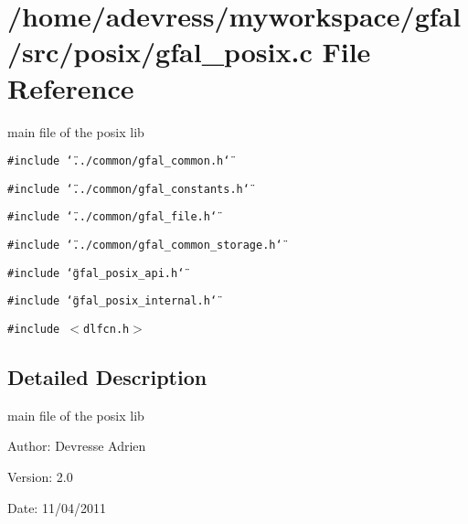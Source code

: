 \section{/home/adevress/myworkspace/gfal/src/posix/gfal\_\-posix.c File Reference}
\label{gfal__posix_8c}
main file of the posix lib 

{\tt \#include \char`\"{}../common/gfal\_\-common.h\char`\"{}}\par
{\tt \#include \char`\"{}../common/gfal\_\-constants.h\char`\"{}}\par
{\tt \#include \char`\"{}../common/gfal\_\-file.h\char`\"{}}\par
{\tt \#include \char`\"{}../common/gfal\_\-common\_\-storage.h\char`\"{}}\par
{\tt \#include \char`\"{}gfal\_\-posix\_\-api.h\char`\"{}}\par
{\tt \#include \char`\"{}gfal\_\-posix\_\-internal.h\char`\"{}}\par
{\tt \#include $<$dlfcn.h$>$}\par


\subsection{Detailed Description}
main file of the posix lib 

\begin{Desc}
\item[Author:]Devresse Adrien \end{Desc}
\begin{Desc}
\item[Version:]2.0 \end{Desc}
\begin{Desc}
\item[Date:]11/04/2011 \end{Desc}
